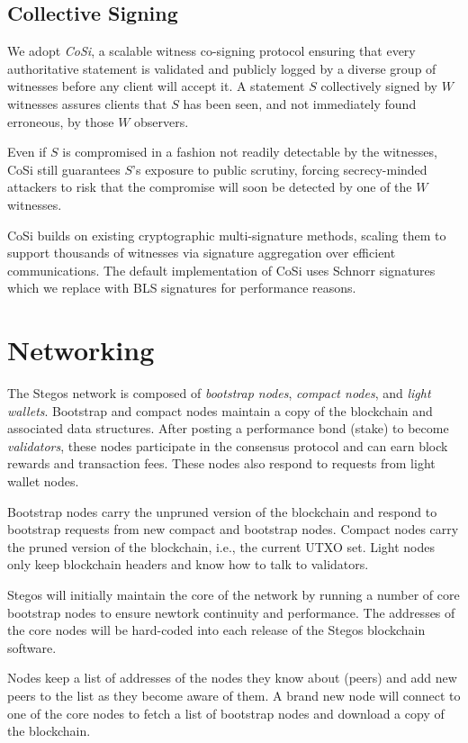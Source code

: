 \documentclass[8pt,fleqn,openany]{book}
\begin{document}
\subsection{Collective Signing}
We adopt \textit{CoSi}\cite{c10,c11}, a scalable witness co-signing protocol ensuring that every authoritative statement is validated and publicly logged by a diverse group of witnesses before any client will accept it. A statement $S$ collectively signed by $W$ witnesses assures clients that $S$ has been seen, and not immediately found erroneous, by those $W$ observers. 

Even if $S$ is compromised in a fashion not readily detectable by the witnesses, CoSi still guarantees $S$’s exposure to public scrutiny, forcing secrecy-minded attackers to risk that the compromise will soon be detected by one of the $W$ witnesses. 

CoSi builds on existing cryptographic multi-signature methods, scaling them to support thousands of witnesses via signature aggregation over efficient communications. The default implementation of CoSi uses Schnorr signatures which we replace with BLS signatures for performance reasons.
	
\section{Networking}
The Stegos network is composed of \textit{bootstrap nodes}, \textit{compact nodes}, and \textit{light wallets}. Bootstrap and compact nodes maintain a copy of the blockchain and associated data structures. After posting a performance bond (stake) to become \textit{validators}, these nodes participate in the consensus protocol and can earn block rewards and transaction fees. These nodes also respond to requests from light wallet nodes.

Bootstrap nodes carry the unpruned version of the blockchain and respond to bootstrap requests from new compact and bootstrap nodes. Compact nodes carry the pruned version of the blockchain, i.e., the current UTXO set. Light nodes only keep blockchain headers and know how to talk to validators. 

Stegos will initially maintain the core of the network by running a number of core bootstrap nodes to ensure newtork continuity and performance. The addresses of the core nodes will be hard-coded into each release of the Stegos blockchain software.

Nodes keep a list of addresses of the nodes they know about (peers) and add new peers to the list as they become aware of them. A brand new node will connect to one of the core nodes to fetch a list of bootstrap nodes and download a copy of the blockchain. 
\end{document}
